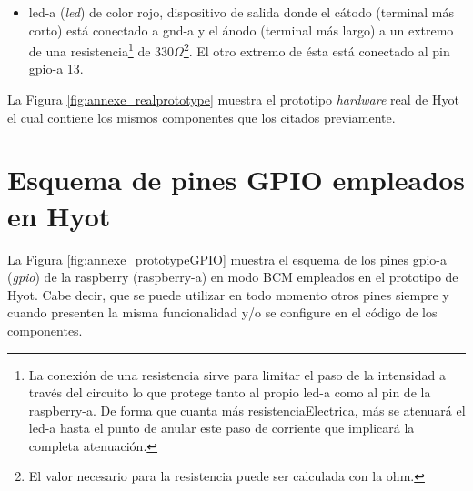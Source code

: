 \documentclass[12pt,a4paper, twoside]{report}
\begin{document}
\begin{itemize}
		\item \gls{led-a} (\textit{\gls{led}}) de color rojo, dispositivo de salida donde el cátodo (terminal más corto) está conectado a \gls{gnd-a} y el ánodo (terminal más largo) a un extremo de una \gls{resistencia}\footnote{La conexión de una \gls{resistencia} sirve para limitar el paso de la \gls{intensidad} a través del circuito lo que protege tanto al propio \gls{led-a} como al pin de la \gls{raspberry-a}. De forma que cuanta más \gls{resistenciaElectrica}, más se atenuará el \gls{led-a} hasta el punto de anular este paso de corriente que implicará la completa atenuación.} de 330$\Omega$\footnote{El valor necesario para la \gls{resistencia} puede ser calculada con la \gls{ohm}.}. El otro extremo de ésta está conectado al pin \gls{gpio-a} 13.					
	\end{itemize}	
	
	La Figura \ref{fig:annexe_realprototype} muestra el \gls{prototipo} \textit{hardware} real de Hyot el cual contiene los mismos componentes que los citados previamente.
	
		
	\chapter{Esquema de pines GPIO empleados en Hyot}\label{prototypeGPIO}
	
	La Figura \ref{fig:annexe_prototypeGPIO} muestra el esquema de los pines \gls{gpio-a} (\textit{\gls{gpio}}) de la \gls{raspberry} (\gls{raspberry-a}) en modo BCM \cite{pinout:rpi} empleados en el \gls{prototipo} de Hyot. Cabe decir, que se puede utilizar en todo momento otros pines siempre y cuando presenten la misma funcionalidad y/o se configure en el código de los componentes.
	
		
\end{document}
